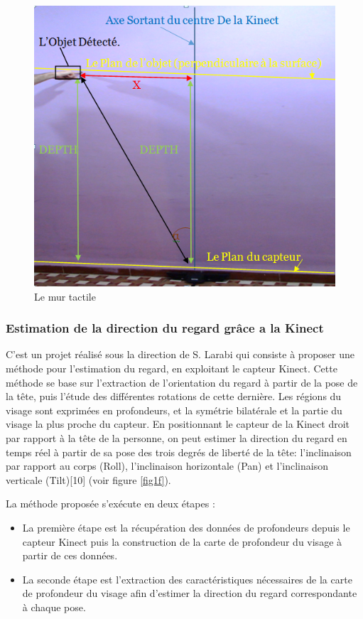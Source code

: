 \documentclass[12pt,a4paper,oneside]{book}
\begin{document}
	\begin{figure}[H]
		\centering
		\includegraphics[scale=0.62]{images/m1.png}
		\caption{Le mur tactile}
		\label{figm}
	\end{figure}
	
	
	
	\subsubsection{Estimation de la direction du regard grâce a la Kinect}
	
	C'est un projet réalisé sous la direction de S. Larabi \cite{10} qui consiste à proposer une méthode pour l’estimation du regard, en exploitant le capteur Kinect. Cette méthode se base sur l'extraction de l'orientation du regard à partir de la pose de la tête, puis l'étude des différentes rotations de cette dernière.
	Les régions du visage sont exprimées en profondeurs, et la symétrie bilatérale et la partie du visage la plus proche du capteur. En positionnant le capteur de la Kinect droit par rapport à la tête de la personne, on peut estimer la direction du regard en temps réel à partir de sa pose des trois degrés de liberté de la tête: l’inclinaison par rapport au corps (Roll), l’inclinaison horizontale (Pan) et l’inclinaison verticale (Tilt)[10] (voir figure \ref{fig1f}).
	
	La méthode proposée s'exécute en deux étapes :
	\begin{itemize}
		\item La première étape est la récupération des données de profondeurs depuis le capteur Kinect puis la construction de la carte de profondeur du visage à partir de ces données.
		\item La seconde étape est l’extraction des caractéristiques nécessaires de la carte de profondeur du visage afin d’estimer la direction du regard correspondante à chaque pose.
	\end{itemize}
	
\end{document}

